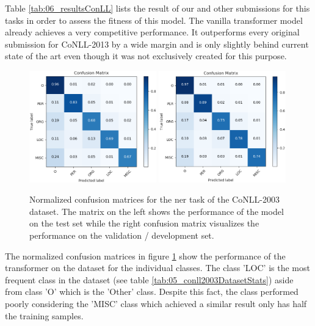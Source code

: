 \bigskip
Table \ref{tab:06_resultsConLL} lists the result of our and other submissions for this tasks in order to assess the fitness of this model. The vanilla transformer model already achieves a very competitive performance. It outperforms every original submission for CoNLL-2013 by a wide margin and is only slightly behind current state of the art \cite{Baevski2019} even though it was not exclusively created for this purpose.
\medskip

\begin{figure}[ht]
	\centering
	\includegraphics[width=0.49\textwidth]{figures/06_results/06_ner_final_test_c_matrix}
	\includegraphics[width=0.49\textwidth]{figures/06_results/06_ner_final_valid_c_matrix}
	\caption{Normalized confusion matrices for the \gls{ner} task of the CoNLL-2003 dataset. The matrix on the left shows the performance of the model on the test set while the right confusion matrix visualizes the performance on the validation / development set.}
	\label{fig:06_NER_cmatrices}
\end{figure}

The normalized confusion matrices in figure \ref{fig:06_NER_cmatrices} show the performance of the transformer on the dataset for the individual classes. The class 'LOC' is the most frequent class in the dataset {(see table \ref{tab:05_conll2003DatasetStats})} aside from class 'O' which is the 'Other' class. Despite this fact, the class performed poorly considering the 'MISC' class which achieved a similar result only has half the training samples.



